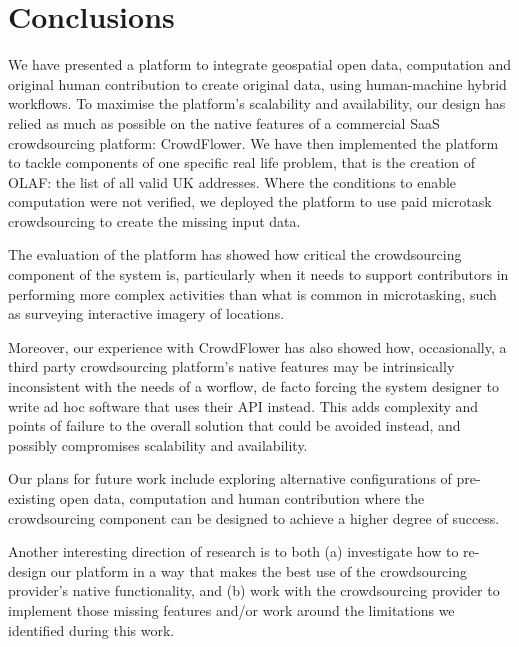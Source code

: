 \section{Conclusions}

We have presented a platform to integrate geospatial open data, computation and original human contribution to create original data, using human-machine hybrid workflows. To maximise the platform's scalability and availability, our design has relied as much as possible on the native features of a commercial SaaS crowdsourcing platform: CrowdFlower. We have then implemented the platform to tackle components of one specific real life problem, that is the creation of OLAF: the list of all valid UK addresses. Where the conditions to enable computation were not verified, we deployed the platform to use paid microtask crowdsourcing to create the missing input data.

The evaluation of the platform has showed how critical the crowdsourcing component of the system is, particularly when it needs to support contributors in performing more complex activities than what is common in microtasking, such as surveying interactive imagery of locations. 

Moreover, our experience with CrowdFlower has also showed how, occasionally, a third party crowdsourcing platform's native features may be intrinsically inconsistent with the needs of a worflow, de facto forcing the system designer to write ad hoc software that uses their API instead. This adds complexity and points of failure to the overall solution that could be avoided instead, and possibly compromises scalability and availability. 

Our plans for future work include exploring alternative configurations of pre-existing open data, computation and human contribution where the crowdsourcing component can be designed to achieve a higher degree of success. 

Another interesting direction of research is to both (a) investigate how to re-design our platform in a way that makes the best use of the crowdsourcing provider's native functionality, and (b) work with the crowdsourcing provider to implement those missing features and/or work around the limitations we identified during this work.
